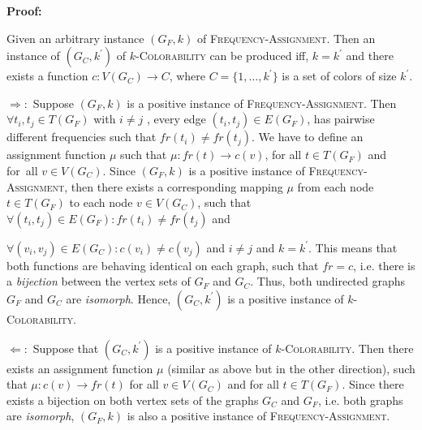 \textbf{Proof:}

\noindent Given an arbitrary instance $(G_{F},k)$ of \textsc{Frequency-Assignment}.
Then an instance of $(G_{C},k^{\prime })$ of $k$\textsc{-Colorability} can
be produced iff, $k=k^{\prime }$ and there exists a function $%
c:V(G_{C})\rightarrow C$, where $C=\{1,\ldots ,k^{\prime }\}$ is a set of
colors of size $k^{\prime }$.

$\Rightarrow :$ Suppose $(G_{F},k)$ is a positive instance of \textsc{%
Frequency-Assignment}. Then $\forall t_{i},t_{j}\in T(G_{F})$ with $i\neq j$%
, every edge $(t_{i},t_{j})\in E(G_{F})$, has pairwise different frequencies
such that $fr(t_{i})\neq fr(t_{j})$. We have to define an assignment
function $\mu $ such that $\mu :fr(t)\rightarrow c(v)$, for all $t\in
T(G_{F})$ and for\ all $v\in V(G_{C})$. Since $(G_{F},k)$ is a positive
instance of \textsc{Frequency-Assignment}, then there exists a corresponding
mapping $\mu $ from each node $t\in T(G_{F})$ to each node $v\in V(G_{C})$,
such that $\forall (t_{i},t_{j})\in E(G_{F}):fr(t_{i})\neq fr(t_{j})$ and 

$\forall (v_{i},v_{j})\in E(G_{C}):c(v_{i})\neq c(v_{j})$ and $i\neq j$ and $%
k=k^{\prime }$. This means that both functions are behaving identical on
each graph, such that $fr=c$, i.e. there is a \textit{bijection} between the
vertex sets of $G_{F}$ and $G_{C}$. Thus, both undirected graphs $G_{F}$ and 
$G_{C}$ are \textit{isomorph}. Hence, $(G_{C},k^{\prime })$ is a positive
instance of $k$\textsc{-Colorability}$.$

$\Leftarrow :$ Suppose that $(G_{C},k^{\prime })$ is a positive instance of $%
k$\textsc{-Colorability}. Then there exists an assignment function $\mu $
(similar as above but in the other direction), such that $\mu
:c(v)\rightarrow fr(t)$ for all $v\in V(G_{C})$ and for all $t\in T(G_{F})$.
Since there exists a bijection on both vertex sets of the graphs $G_{C}$ and 
$G_{F}$, i.e. both graphs are \textit{isomorph}, $(G_{F},k)$ is also a
positive instance of \textsc{Frequency-Assignment}.

\bigskip 
